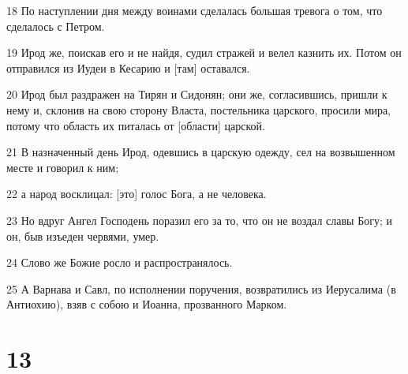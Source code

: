 \par 18 По наступлении дня между воинами сделалась большая тревога о том, что сделалось с Петром.
\par 19 Ирод же, поискав его и не найдя, судил стражей и велел казнить их. Потом он отправился из Иудеи в Кесарию и [там] оставался.
\par 20 Ирод был раздражен на Тирян и Сидонян; они же, согласившись, пришли к нему и, склонив на свою сторону Власта, постельника царского, просили мира, потому что область их питалась от [области] царской.
\par 21 В назначенный день Ирод, одевшись в царскую одежду, сел на возвышенном месте и говорил к ним;
\par 22 а народ восклицал: [это] голос Бога, а не человека.
\par 23 Но вдруг Ангел Господень поразил его за то, что он не воздал славы Богу; и он, быв изъеден червями, умер.
\par 24 Слово же Божие росло и распространялось.
\par 25 А Варнава и Савл, по исполнении поручения, возвратились из Иерусалима (в Антиохию), взяв с собою и Иоанна, прозванного Марком.

\chapter{13}

